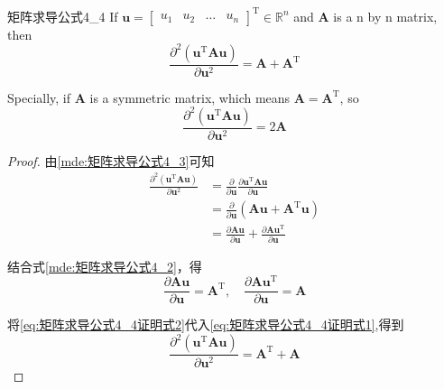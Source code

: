 \documentclass[withoutpreface,bwprint]{NoteBook}
\begin{document}
\begin{matrixDerivativeEquation}
    {}
    {矩阵求导公式4_4}
    If
    $\mathbf{u}=
    \begin{bmatrix}
        u_1 & u_2 & \dots & u_n     
    \end{bmatrix}^\mathrm{T} \in \mathbb{R}^n$ and
    $\mathbf{A}$ is a n by n matrix, then
    $$
    \frac{\partial^2 ( \mathbf{u}^\mathrm{T} \mathbf{A} \mathbf{u} )}{\partial \mathbf{u}^2}
    =
    \mathbf{A} + \mathbf{A}^\mathrm{T}
    $$
    
    Specially, if $\mathbf{A}$ is a symmetric matrix, 
    which means $\mathbf{A} = \mathbf{A}^\mathrm{T}$, 
    so
    $$
    \frac{\partial^2 ( \mathbf{u}^\mathrm{T} \mathbf{A} \mathbf{u} )}{\partial \mathbf{u}^2}
    =
    2 \mathbf{A} 
    $$
\end{matrixDerivativeEquation}

\begin{proof}
由\cref{mde:矩阵求导公式4_3}可知
\begin{align}
    \label{eq:矩阵求导公式4_4证明式1}
    \nonumber
    \frac{\partial^2 ( \mathbf{u}^\mathrm{T} \mathbf{A} \mathbf{u} )}{\partial \mathbf{u}^2}
    & \nonumber
    =
    \frac{\partial }{\partial \mathbf{u}} \frac{\partial  \mathbf{u}^\mathrm{T} \mathbf{A} \mathbf{u}}{\partial \mathbf{u}} \\
    & \nonumber
    =
    \frac{\partial }{\partial \mathbf{u}} (\mathbf{A} \mathbf{u} + \mathbf{A}^\mathrm{T} \mathbf{u} ) \\
    &=
    \frac{\partial \mathbf{A} \mathbf{u}}{\partial \mathbf{u}}  + \frac{\partial \mathbf{A} \mathbf{u}^\mathrm{T}}{\partial \mathbf{u}}
\end{align}

结合式\cref{mde:矩阵求导公式4_2}，得
\begin{equation}
    \label{eq:矩阵求导公式4_4证明式2}
    \frac{\partial \mathbf{A} \mathbf{u}}{\partial \mathbf{u}}=\mathbf{A}^\mathrm{T},
    \quad 
    \frac{\partial \mathbf{A} \mathbf{u}^\mathrm{T}}{\partial \mathbf{u}}=\mathbf{A}
\end{equation}

将\cref{eq:矩阵求导公式4_4证明式2}代入\cref{eq:矩阵求导公式4_4证明式1},得到
\begin{equation}
    \label{eq:矩阵求导公式4_4证明式3}
    \frac{\partial^2 ( \mathbf{u}^\mathrm{T} \mathbf{A} \mathbf{u} )}{\partial \mathbf{u}^2}
    =
    \mathbf{A}^\mathrm{T} + \mathbf{A}
\end{equation}
\end{proof}
\end{document}
